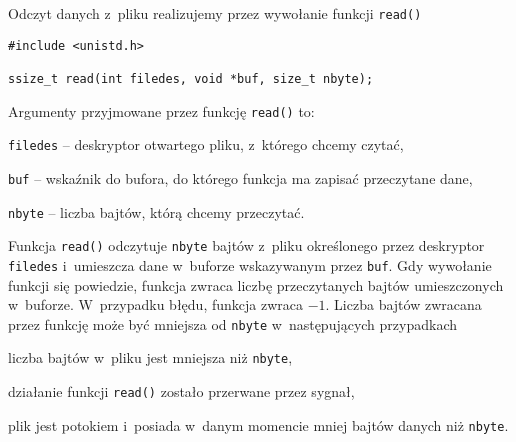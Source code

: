 Odczyt danych z~pliku realizujemy przez wywołanie funkcji \texttt{read()}
\begin{lstlisting}[style=MyCStyle]
#include <unistd.h>

ssize_t read(int filedes, void *buf, size_t nbyte);
\end{lstlisting}
Argumenty przyjmowane przez funkcję \texttt{read()} to:
\begin{myitemize}
  \item \texttt{filedes} -- deskryptor otwartego pliku, z~którego chcemy czytać,
  \item \texttt{buf} -- wskaźnik do bufora, do którego funkcja ma zapisać przeczytane dane,
  \item \texttt{nbyte} -- liczba bajtów, którą chcemy przeczytać.
\end{myitemize}
Funkcja \texttt{read()} odczytuje \texttt{nbyte} bajtów z~pliku określonego
przez deskryptor \texttt{filedes} i~umieszcza dane w~buforze wskazywanym przez
\texttt{buf}. Gdy wywołanie funkcji się powiedzie, funkcja zwraca liczbę
przeczytanych bajtów umieszczonych w~buforze. W~przypadku błędu, funkcja zwraca
$-1$. Liczba bajtów zwracana przez funkcję może być mniejsza od \texttt{nbyte}
w~następujących przypadkach
\begin{myitemize}
  \item liczba bajtów w~pliku jest mniejsza niż \texttt{nbyte},
  \item działanie funkcji \texttt{read()} zostało przerwane przez sygnał,
  \item plik jest potokiem i~posiada w~danym momencie mniej bajtów danych niż
        \texttt{nbyte}.
\end{myitemize}

